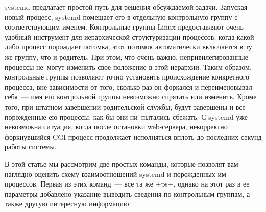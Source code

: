 \documentclass[10pt,oneside,a4paper]{article}
\begin{document}
systemd предлагает простой путь для решения обсуждаемой задачи. Запуская
новый процесс, systemd помещает его в отдельную контрольную группу
с соответствующим именем. Контрольные группы Linux предоставляют очень
удобный инструмент для иерархической структуризации процессов: когда
какой-либо процесс порождает потомка, этот потомок автоматически включается в
ту же группу, что и родитель. При этом, что очень важно, непривилегированные
процессы не~могут изменить свое положение в этой иерархии. Таким образом,
контрольные группы позволяют точно установить происхождение конкретного
процесса, вне зависимости от того, сколько раз он форкался и переименовывал
себя~--- имя его контрольной группы невозможно спрятать или изменить. Кроме
того, при штатном завершении родительской службы, будут завершены и все
порожденные ею процессы, как бы они ни~пытались сбежать. С systemd уже
невозможна ситуация, когда после остановки web-сервера, некорректно
форкнувшийся CGI-процесс продолжает исполняться вплоть до последних секунд
работы системы.

В этой статье мы рассмотрим две простых команды, которые позволят вам
наглядно оценить схему взаимоотношений systemd и порожденных им процессов.
Первая из этих команд~--- все та же +ps+, однако на этот раз в ее параметры
добавлено указание выводить сведения по контрольным группам, а также другую
интересную информацию: 
\end{document}
